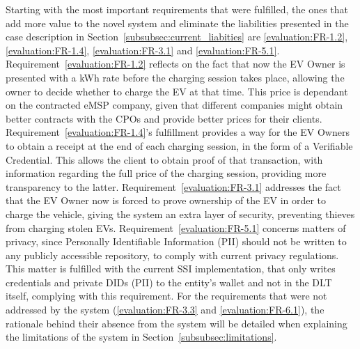 Starting with the most important requirements that were fulfilled, the ones that add more value to the novel system and eliminate the liabilities presented in the case description in Section~\ref{subsubsec:current_liabities} are \ref{evaluation:FR-1.2}, \ref{evaluation:FR-1.4}, \ref{evaluation:FR-3.1} and \ref{evaluation:FR-5.1}. Requirement~\ref{evaluation:FR-1.2} reflects on the fact that now the EV Owner is presented with a kWh rate before the charging session takes place, allowing the owner to decide whether to charge the EV at that time. This price is dependant on the contracted eMSP company, given that different companies might obtain better contracts with the CPOs and provide better prices for their clients. Requirement~\ref{evaluation:FR-1.4}'s fulfillment provides a way for the EV Owners to obtain a receipt at the end of each charging session, in the form of a Verifiable Credential. This allows the client to obtain proof of that transaction, with information regarding the full price of the charging session, providing more transparency to the latter. Requirement~\ref{evaluation:FR-3.1} addresses the fact that the EV Owner now is forced to prove ownership of the EV in order to charge the vehicle, giving the system an extra layer of security, preventing thieves from charging stolen EVs. Requirement~\ref{evaluation:FR-5.1} concerns matters of privacy, since Personally Identifiable Information (PII) should not be written to any publicly accessible repository, to comply with current privacy regulations. This matter is fulfilled with the current SSI implementation, that only writes credentials and private DIDs (PII) to the entity's wallet and not in the DLT itself, complying with this requirement. For the requirements that were not addressed by the system (\ref{evaluation:FR-3.3} and \ref{evaluation:FR-6.1}), the rationale behind their absence from the system will be detailed when explaining the limitations of the system in Section~\ref{subsubsec:limitations}.

